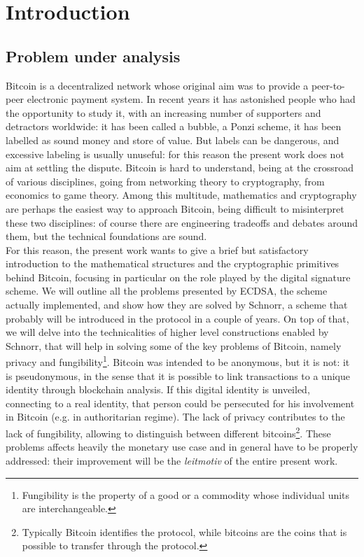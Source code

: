 \chapter{Introduction}
\label{chpr:intro}
\section{Problem under analysis}
Bitcoin \cite{BTC} is a decentralized network whose original aim was to provide a peer-to-peer electronic payment system. In recent years it has astonished people who had the opportunity to study it, with an increasing number of supporters and detractors worldwide: it has been called a bubble, a Ponzi scheme, it has been labelled as sound money and store of value. But labels can be dangerous, and excessive labeling is usually unuseful: for this reason the present work does not aim at settling the dispute. Bitcoin is hard to understand, being at the crossroad of various disciplines, going from networking theory to cryptography, from economics to game theory. Among this multitude, mathematics and cryptography are perhaps the easiest way to approach Bitcoin, being difficult to misinterpret these two disciplines: of course there are engineering tradeoffs and debates around them, but the technical foundations are sound.
\\
For this reason, the present work wants to give a brief but satisfactory introduction to the mathematical structures and the cryptographic primitives behind Bitcoin, focusing in particular on the role played by the digital signature scheme. We will outline all the problems presented by ECDSA, the scheme actually implemented, and show how they are solved by Schnorr, a scheme that probably will be introduced in the protocol in a couple of years. On top of that, we will delve into the technicalities of higher level constructions enabled by Schnorr, that will help in solving some of the key problems of Bitcoin, namely privacy and fungibility\footnote{Fungibility is the property of a good or a commodity whose individual units are interchangeable.}. Bitcoin was intended to be anonymous, but it is not: it is pseudonymous, in the sense that it is possible to link transactions to a unique identity through blockchain analysis. If this digital identity is unveiled, connecting to a real identity, that person could be persecuted for his involvement in Bitcoin (e.g. in authoritarian regime). The lack of privacy contributes to the lack of fungibility, allowing to distinguish between different bitcoins\footnote{Typically Bitcoin identifies the protocol, while bitcoins are the coins that is possible to transfer through the protocol.}. These problems affects heavily the monetary use case and in general have to be properly addressed: their improvement will be the \textit{leitmotiv} of the entire present work.

